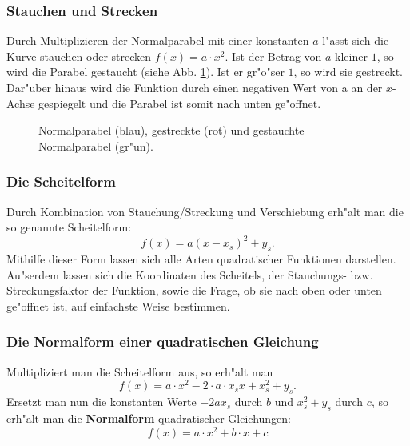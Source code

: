 \subsubsection{Stauchen und Strecken}
Durch Multiplizieren der Normalparabel mit einer konstanten $a$ l"asst sich die Kurve stauchen oder strecken $f(x)=a \cdot x^2$. Ist der Betrag von $a$ kleiner $1$, so wird die Parabel gestaucht (siehe Abb. \ref{fig:parabel}). Ist er gr"o"ser $1$, so wird sie gestreckt. Dar"uber hinaus wird die Funktion durch einen negativen Wert von a an der $x$-Achse gespiegelt und die Parabel ist somit nach unten ge"offnet.
\begin{figure}[h!]
\begin{center}
\end{center}
\caption{Normalparabel (blau), gestreckte (rot) und gestauchte Normalparabel (gr"un).}
\label{fig:parabel}
\end{figure}

\subsubsection{Die Scheitelform}
Durch Kombination von Stauchung/Streckung und Verschiebung erh"alt man die so genannte Scheitelform: 
\begin{equation*}
f(x)=a(x-x_s)^2+y_s.
\end{equation*}
Mithilfe dieser Form lassen sich alle Arten quadratischer Funktionen darstellen. Au"serdem lassen sich die Koordinaten des Scheitels, der Stauchungs- bzw. Streckungsfaktor der Funktion, sowie die Frage, ob sie nach oben oder unten ge"offnet ist, auf einfachste Weise bestimmen.

\subsubsection{Die Normalform einer quadratischen Gleichung}
Multipliziert man die Scheitelform aus, so erh"alt man 
\begin{equation*}
f(x)=a \cdot x^2-2 \cdot a \cdot x_sx+x_s^2+y_s.
\end{equation*}
Ersetzt man nun die konstanten Werte $-2ax_s$ durch $b$ und $x_s^2+y_s$ durch $c$, so erh"alt man die \textbf{Normalform} quadratischer Gleichungen:
\begin{equation*}
f(x)=a \cdot x^2+b \cdot x+c
\end{equation*}

